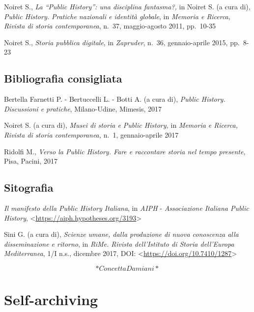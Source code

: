 \documentclass[
  b5paper,
  twoside,
  11pt,
  chapterprefix=false,
  bibliography=totocnumbered,
  parskip=0]{scrbook}
\begin{document}
Noiret S., \emph{La \enquote{Public History}: una disciplina fantasma?,} in Noiret S.
(a cura di), \emph{Public History. Pratiche nazionali e identità globale}, in
\emph{Memoria e Ricerca, Rivista di storia contemporanea}, n.~37,
maggio-agosto 2011, pp.~10-35

Noiret S., \emph{Storia pubblica digitale}, in \emph{Zapruder}, n.~36,
gennaio-aprile 2015, pp.~8-23

\hypertarget{bibliografia-consigliata-21}{%
\section*{Bibliografia consigliata}\label{bibliografia-consigliata-21}}

Bertella Farnetti P. - Bertuccelli L. - Botti A. (a cura di), \emph{Public
History. Discussioni e pratiche}, Milano-Udine, Mimesis, 2017

Noiret S. (a cura di), \emph{Musei di storia e Public History,} in \emph{Memoria e
Ricerca, Rivista di storia contemporanea,} n.~1, gennaio-aprile 2017

Ridolfi M., \emph{Verso la Public History. Fare e raccontare storia nel tempo
presente}, Pisa, Pacini, 2017

\hypertarget{sitografia-27}{%
\section*{Sitografia}\label{sitografia-27}}

\emph{Il manifesto della Public History Italiana}, in \emph{AIPH} - \emph{Associazione
Italiana Public History},
\textless{}\href{https://aiph.hypotheses.org/3193}{{https://aiph.hypotheses.org/3193}}\textgreater{}

Sini G. (a cura di), \emph{Scienze umane, dalla produzione di nuova
conoscenza alla disseminazione e ritorno}, in \emph{RiMe. Rivista
dell'Istituto di Storia dell'Europa Mediterranea}, 1/I n.s., dicembre
2017, DOI:
\textless{}\href{https://doi.org/10.7410/1287}{{https://doi.org/10.7410/1287}}\textgreater{}

\[*Concetta Damiani*\]

\hypertarget{self-archiving}{%
\chapter{Self-archiving}\label{self-archiving}}
\end{document}
